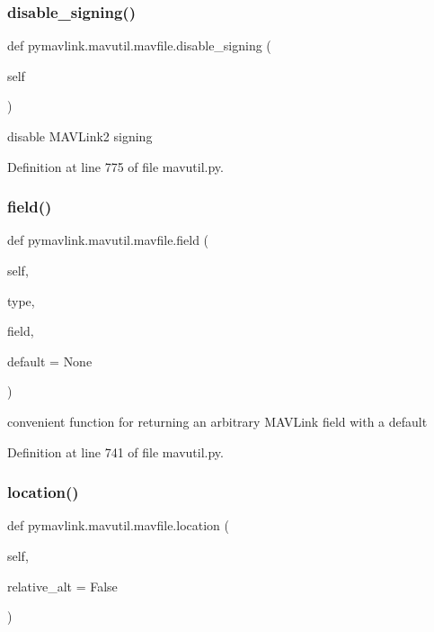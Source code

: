 \subsubsection{\texorpdfstring{disable\_signing()}{disable\_signing()}}
{\footnotesize\ttfamily def pymavlink.\+mavutil.\+mavfile.\+disable\+\_\+signing (\begin{DoxyParamCaption}\item[{}]{self }\end{DoxyParamCaption})}

\begin{DoxyVerb}disable MAVLink2 signing\end{DoxyVerb}
 

Definition at line 775 of file mavutil.\+py.

\mbox{\label{classpymavlink_1_1mavutil_1_1mavfile_ae2070e90f4df43fc8b44ae29a9a996ed}} 
\subsubsection{\texorpdfstring{field()}{field()}}
{\footnotesize\ttfamily def pymavlink.\+mavutil.\+mavfile.\+field (\begin{DoxyParamCaption}\item[{}]{self,  }\item[{}]{type,  }\item[{}]{field,  }\item[{}]{default = {\ttfamily None} }\end{DoxyParamCaption})}

\begin{DoxyVerb}convenient function for returning an arbitrary MAVLink
   field with a default\end{DoxyVerb}
 

Definition at line 741 of file mavutil.\+py.

\mbox{\label{classpymavlink_1_1mavutil_1_1mavfile_a15c2f7419959d23ebf1729bbd7871905}} 
\subsubsection{\texorpdfstring{location()}{location()}}
{\footnotesize\ttfamily def pymavlink.\+mavutil.\+mavfile.\+location (\begin{DoxyParamCaption}\item[{}]{self,  }\item[{}]{relative\+\_\+alt = {\ttfamily False} }\end{DoxyParamCaption})}

